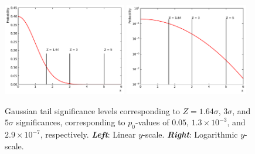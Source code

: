\begin{figure}[!htb]
    \begin{center}
        \includegraphics[width=0.48\textwidth]{figures/common_ana/stat_hypo/pval_sig_lin}
        \includegraphics[width=0.48\textwidth]{figures/common_ana/stat_hypo/pval_sig_log}
        \caption{
            Gaussian tail significance levels corresponding to $Z = 1.64\sigma$, $3\sigma$, and $5\sigma$
            significances, corresponding to $p_0$-values of $0.05$, $1.3 \times 10^{-3}$, and $2.9\times 10^{-7}$, respectively.
            \textbf{\textit{Left}}: Linear $y$-scale. \textbf{\textit{Right}}: Logarithmic $y$-scale.
        }
        \label{fig:pval_sig}
    \end{center}
\end{figure}



